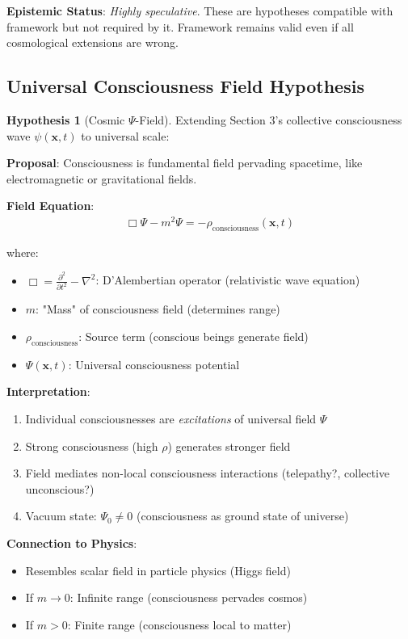 \documentclass[11pt,a4paper]{article}
\theoremstyle{definition}
\newtheorem{hypothesis}{Hypothesis}[section]
\theoremstyle{remark}
\begin{document}
\begin{enumerate}
\begin{mdframed}[backgroundcolor=cyan!5,linewidth=2pt]
\textbf{Epistemic Status}: \textit{Highly speculative}. These are hypotheses compatible with framework but not required by it. Framework remains valid even if all cosmological extensions are wrong.
\end{mdframed}

\subsection{Universal Consciousness Field Hypothesis}

\begin{hypothesis}[Cosmic \(\Psi\)-Field]
Extending Section 3's collective consciousness wave \(\psi(\mathbf{x}, t)\) to universal scale:

\textbf{Proposal}: Consciousness is fundamental field pervading spacetime, like electromagnetic or gravitational fields.

\textbf{Field Equation}:
\begin{align}
\Box \Psi - m^2 \Psi = -\rho_{\text{consciousness}}(\mathbf{x}, t)
\end{align}

where:
\begin{itemize}
    \item \(\Box = \frac{\partial^2}{\partial t^2} - \nabla^2\): D'Alembertian operator (relativistic wave equation)
    \item \(m\): "Mass" of consciousness field (determines range)
    \item \(\rho_{\text{consciousness}}\): Source term (conscious beings generate field)
    \item \(\Psi(\mathbf{x}, t)\): Universal consciousness potential
\end{itemize}

\textbf{Interpretation}:
\begin{enumerate}
    \item Individual consciousnesses are \textit{excitations} of universal field \(\Psi\)
    \item Strong consciousness (high \(\rho\)) generates stronger field
    \item Field mediates non-local consciousness interactions (telepathy?, collective unconscious?)
    \item Vacuum state: \(\Psi_0 \neq 0\) (consciousness as ground state of universe)
\end{enumerate}

\textbf{Connection to Physics}:
\begin{itemize}
    \item Resembles scalar field in particle physics (Higgs field)
    \item If \(m \to 0\): Infinite range (consciousness pervades cosmos)
    \item If \(m > 0\): Finite range (consciousness local to matter)
\end{itemize}
\end{hypothesis}


\end{enumerate}
\end{document}
